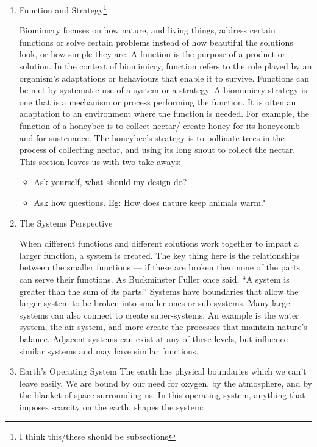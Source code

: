 \begin{enumerate}
  \item Function and Strategy\footnote{I think this/these should be subsections}
  

Biomimcry focuses on how nature, and living things, address certain functions or solve certain problems instead of how beautiful the solutions look, or how simple they are. A function is the purpose of a product or solution. In the context of biomimicry, function refers to the role played by an organism's adaptations or behaviours that enable it to survive. Functions can be met by systematic use of a system or a strategy. A biomimicry strategy is one that is a mechanism or process performing the function. It is often an adaptation to an environment where the function is needed. For example, the function of a honeybee is to collect nectar/ create honey for its honeycomb and for sustenance. The honeybee's strategy is to pollinate trees in the process of collecting nectar, and using its long snout to collect the nectar.
This section leaves us with two take-aways:

  \begin{itemize}
\item Ask yourself, what should my design do? 
\item Ask how questions. Eg: How does nature keep animals warm?
  \end{itemize}



  \item The Systems Perspective
	
When different functions and different solutions work together to impact a larger function, a system is created. The key thing here is the relationships between the smaller functions --- if these are broken then none of the parts can serve their functions. As Buckminster Fuller once said, ``A system is greater than the sum of its parts.'' Systems have boundaries that allow the larger system to be broken into smaller ones or sub-systems. Many large systems can also connect to create super-systems. An example is the water system, the air system, and more create the processes that maintain nature's balance. Adjacent systems can exist at any of these levels, but influence similar systems and may have similar functions.

\item Earth's Operating System
The earth has physical boundaries which we can't leave easily. We are bound by our need for oxygen, by the atmosphere, and by the blanket of space surrounding us.
In this operating system, anything that imposes scarcity on the earth, shapes the system:


\end{enumerate}
